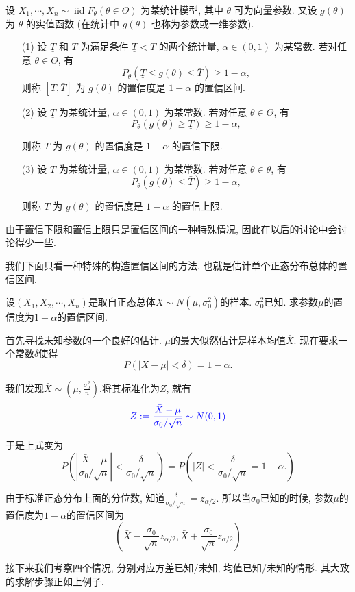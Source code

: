 \begin{definition}
    设 $X_1, \cdots, X_n \sim \operatorname{iid} F_\theta(\theta \in \Theta)$ 为某统计模型, 其中 $\theta$ 可为向量参数. 又设 $g(\theta)$ 为 $\theta$ 的实值函数 (在统计中 $g(\theta)$ 也称为参数或一维参数).

    \begin{itemize}
        \item [(1)] 设 $\underline{T}$ 和 $\bar{T}$ 为满足条件 $\underline{T}<\bar{T}$ 的两个统计量, $\alpha \in(0,1)$ 为某常数. 若对任意 $\theta \in \Theta$, 有
        $$
        P_\theta(\underline{T} \leq g(\theta) \leq \bar{T}) \geqslant 1-\alpha,
        $$
        则称 $[\underline T, \bar{T}]$ 为 $g(\theta)$ 的置信度是 $1-\alpha$ 的置信区间.
        \item [(2)] 设 $\underline T$ 为某统计量, $\alpha \in(0,1)$ 为某常数. 若对任意 $\theta \in \Theta$, 有
        $$
        P_\theta(g(\theta) \geqslant \underline{T}) \geqslant 1-\alpha,
        $$
        
        则称 $\underline T$ 为 $g(\theta)$ 的置信度是 $1-\alpha$ 的置信下限.
        \item [(3)] 设 $\bar{T}$ 为某统计量, $\alpha \in(0,1)$ 为某常数. 若对任意 $\theta \in \theta$, 有
        $$
        P_\theta(g(\theta) \leq \bar{T}) \geqslant 1-\alpha,
        $$
        
        则称 $\bar{T}$ 为 $g(\theta)$ 的置信度是 $1-\alpha$ 的置信上限.
    \end{itemize}
\end{definition}
由于置信下限和置信上限只是置信区间的一种特殊情况, 因此在以后的讨论中会讨论得少一些. 

我们下面只看一种特殊的构造置信区间的方法. 也就是估计单个正态分布总体的置信区间.

\begin{example}
    设$(X_1, X_2, \cdots, X_n)$是取自正态总体$X\sim N(\mu, \sigma_0^2)$的样本. $\sigma_0^2$已知. 求参数$\mu$的置信度为$1-\alpha$的置信区间.
\end{example}

\begin{solution}
    首先寻找未知参数的一个良好的估计. $\mu$的最大似然估计是样本均值$\bar X$. 现在要求一个常数$\delta$使得
$$
P(|X-\mu|<\delta)=1-\alpha.
$$

我们发现$\bar X \sim \left(\mu, \frac{\sigma_0^2}{n}\right).$将其标准化为$Z$, 就有
$$
{{\color{blue}Z:=\frac{
    \bar X-\mu
}{\sigma_0 / \sqrt n} \sim N(0, 1)}}
$$

于是上式变为
$$
P\left(
    \left|
       \frac{ \bar X - \mu }
            {\sigma_0 / \sqrt n}
    \right|
    < 
    \frac{
        \delta
    }{\sigma_0 / \sqrt n}
\right)=P\left(
    |Z|
    < 
    \frac{
        \delta
    }{\sigma_0 / \sqrt n}=1-\alpha.
\right)
$$

由于标准正态分布上面的分位数, 知道$\frac{\delta}{\sigma_0/\sqrt n}=z_{\alpha/2}$. 所以当$\sigma_0$已知的时候, 参数$\mu$的置信度为$1-\alpha$的置信区间为
$$
\left(
    \bar X - \frac{\sigma_0}{\sqrt n} z_{\alpha/2}, 
    \bar X + \frac{\sigma_0}{\sqrt n} z_{\alpha/2}
\right)
$$
\end{solution}

接下来我们考察四个情况, 分别对应方差已知/未知, 均值已知/未知的情形. 其大致的求解步骤正如上例子. 




